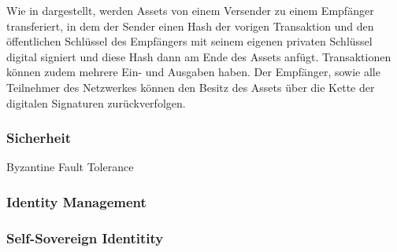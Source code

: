 	    Wie in  dargestellt, werden Assets von einem Versender zu einem Empfänger transferiert, in dem der Sender einen Hash der vorigen Transaktion und den öffentlichen Schlüssel des Empfängers mit seinem eigenen privaten Schlüssel digital signiert und diese Hash dann am Ende des Assets anfügt.
	    Transaktionen können zudem mehrere Ein- und Ausgaben haben\cite{Nakamoto2008}.
	    Der Empfänger, sowie alle Teilnehmer des Netzwerkes können den Besitz des Assets über die Kette der digitalen Signaturen zurückverfolgen\cite{Nakamoto2008}.
    
    
    \begin{figure}[H]
    \end{figure}
    
    \subsubsection{Sicherheit}
    \label{sec:sota_blockchain_security}
    Byzantine Fault Tolerance
    
    \subsubsection{Identity Management}
    \label{sec:sota_blockchain_identitymgmnt}
    \subsubsection{Self-Sovereign Identitity}
    \label{sec:sota_blockchain_sovreign}



